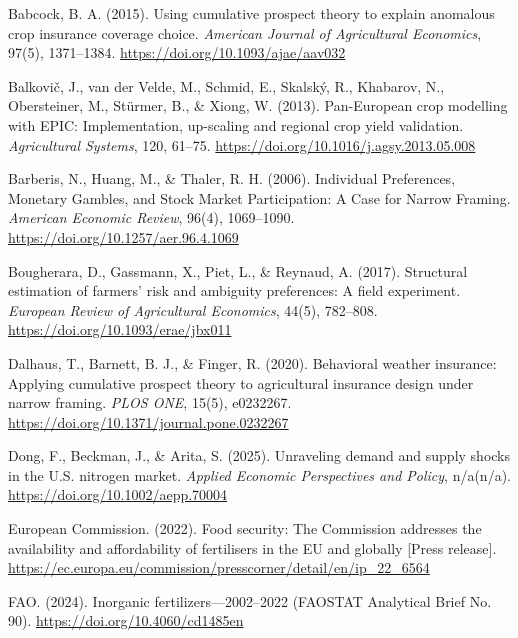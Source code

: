 \documentclass[12pt,a4paper]{article}
\begin{document}
\begin{description}

\item Babcock, B. A. (2015). Using cumulative prospect theory to explain anomalous crop insurance coverage choice. \textit{American Journal of Agricultural Economics}, 97(5), 1371--1384. \url{https://doi.org/10.1093/ajae/aav032}

\item Balkovi\v{c}, J., van der Velde, M., Schmid, E., Skalsk\'{y}, R., Khabarov, N., Obersteiner, M., St\"{u}rmer, B., \& Xiong, W. (2013). Pan-European crop modelling with EPIC: Implementation, up-scaling and regional crop yield validation. \textit{Agricultural Systems}, 120, 61--75. \url{https://doi.org/10.1016/j.agsy.2013.05.008}

\item Barberis, N., Huang, M., \& Thaler, R. H. (2006). Individual Preferences, Monetary Gambles, and Stock Market Participation: A Case for Narrow Framing. \textit{American Economic Review}, 96(4), 1069--1090. \url{https://doi.org/10.1257/aer.96.4.1069}

\item Bougherara, D., Gassmann, X., Piet, L., \& Reynaud, A. (2017). Structural estimation of farmers' risk and ambiguity preferences: A field experiment. \textit{European Review of Agricultural Economics}, 44(5), 782--808. \url{https://doi.org/10.1093/erae/jbx011}

\item Dalhaus, T., Barnett, B. J., \& Finger, R. (2020). Behavioral weather insurance: Applying cumulative prospect theory to agricultural insurance design under narrow framing. \textit{PLOS ONE}, 15(5), e0232267. \url{https://doi.org/10.1371/journal.pone.0232267}

\item Dong, F., Beckman, J., \& Arita, S. (2025). Unraveling demand and supply shocks in the U.S. nitrogen market. \textit{Applied Economic Perspectives and Policy}, n/a(n/a). \url{https://doi.org/10.1002/aepp.70004}

\item European Commission. (2022). Food security: The Commission addresses the availability and affordability of fertilisers in the EU and globally [Press release]. \url{https://ec.europa.eu/commission/presscorner/detail/en/ip_22_6564}

\item FAO. (2024). Inorganic fertilizers---2002--2022 (FAOSTAT Analytical Brief No. 90). \url{https://doi.org/10.4060/cd1485en}


\end{description}
\end{document}
